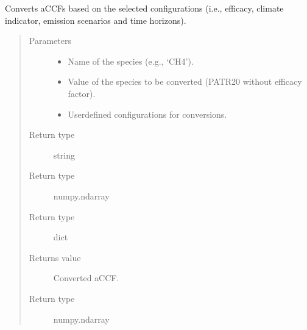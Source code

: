 \documentclass[a4paper,11pt,english]{sphinxmanual}
\begin{document}
\begin{fulllineitems}
\label{\detokenize{modules:envlib.accf.convert_accf}}
Converts aCCFs based on the selected configurations (i.e., efficacy, climate indicator, emission scenarios and time horizons).
\begin{quote}\begin{description}
\item[{Parameters}] \leavevmode\begin{itemize}
\item {} 
 \textendash{} Name of the species (e.g., ‘CH4’).

\item {} 
 \textendash{} Value of the species to be converted (P\sphinxhyphen{}ATR20 without efficacy factor).

\item {} 
 \textendash{} User\sphinxhyphen{}defined configurations for conversions.

\end{itemize}

\item[{Return type}] \leavevmode
string

\item[{Return type}] \leavevmode
numpy.ndarray

\item[{Return type}] \leavevmode
dict

\item[{Returns value}] \leavevmode
Converted aCCF.

\item[{Return type}] \leavevmode
numpy.ndarray

\end{description}\end{quote}

\end{fulllineitems}

\end{document}
